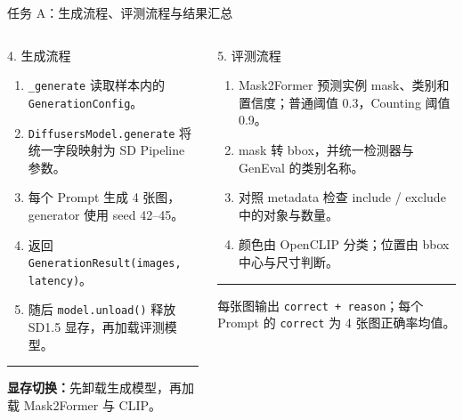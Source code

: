 \documentclass[aspectratio=169,10pt]{beamer}
\begin{document}
\begin{frame}{任务 A：生成流程、评测流程与结果汇总}
  \begin{columns}[T,onlytextwidth]
      \begin{block}{4. 生成流程}
        \begin{minipage}[c][5.05cm][c]{\linewidth}
          \begin{enumerate}\scriptsize
            \item \texttt{\_generate} 读取样本内的 \texttt{GenerationConfig}。
            \item \texttt{DiffusersModel.generate} 将统一字段映射为 SD Pipeline 参数。
            \item 每个 Prompt 生成 4 张图，generator 使用 seed 42--45。
            \item 返回 \texttt{GenerationResult(images, latency)}。
            \item 随后 \texttt{model.unload()} 释放 SD1.5 显存，再加载评测模型。
          \end{enumerate}
          \vspace{0.45em}
          \color{T2IGray}\rule{\linewidth}{0.35pt}\par\vspace{0.3em}
          \scriptsize\textbf{显存切换：}先卸载生成模型，再加载 Mask2Former 与 CLIP。
        \end{minipage}
      \end{block}

      \begin{block}{5. 评测流程}
        \begin{minipage}[c][5.05cm][c]{\linewidth}
          \begin{enumerate}\scriptsize
            \item Mask2Former 预测实例 mask、类别和置信度；普通阈值 0.3，Counting 阈值 0.9。
            \item mask 转 bbox，并统一检测器与 GenEval 的类别名称。
            \item 对照 metadata 检查 include / exclude 中的对象与数量。
            \item 颜色由 OpenCLIP 分类；位置由 bbox 中心与尺寸判断。
          \end{enumerate}
          \vspace{0.45em}
          \color{T2IGray}\rule{\linewidth}{0.35pt}\par\vspace{0.3em}
          \scriptsize
          每张图输出 \texttt{correct + reason}；每个 Prompt 的 \texttt{correct} 为 4 张图正确率均值。
        \end{minipage}
      \end{block}


\end{columns}
\end{frame}
\end{document}
